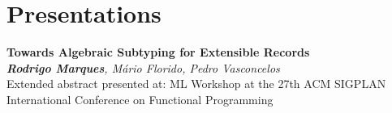 \documentclass[11pt,a4paper]{moderncv}
\begin{document}
\section{Presentations}

\begin{description}[labelwidth=60pt,align=right,leftmargin=!]
    \item[\normalfont{\emph{ML 2022}}]
        \textbf{Towards Algebraic Subtyping for Extensible Records}
        \\ \emph{\textbf{Rodrigo Marques}, Mário Florido, Pedro Vasconcelos}                                
        \\ Extended abstract presented at: ML Workshop at the 27th ACM SIGPLAN International Conference on Functional Programming
\end{description}
\end{document}
